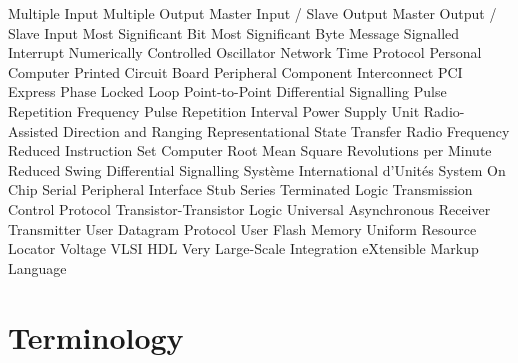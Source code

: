 {\begin{List}
      {Multiple Input Multiple Output}
      {Master Input / Slave Output}
      {Master Output / Slave Input}
       {Most Significant Bit}
       {Most Significant Byte}
       {Message Signalled Interrupt}
       {Numerically Controlled Oscillator}
       {Network Time Protocol}
        {Personal Computer}
       {Printed Circuit Board}
       {Peripheral Component Interconnect}
      {PCI Express}
       {Phase Locked Loop}
      {Point-to-Point Differential Signalling}
       {Pulse Repetition Frequency}
       {Pulse Repetition Interval}
       {Power Supply Unit}
     {Radio-Assisted Direction and Ranging}
      {Representational State Transfer}
        {Radio Frequency}
      {Reduced Instruction Set Computer}
       {Root Mean Square}
       {Revolutions per Minute}
      {Reduced Swing Differential Signalling}
        {Syst\`eme International d'Unit\'es}
       {System On Chip}
       {Serial Peripheral Interface}
      {Stub Series Terminated Logic}
       {Transmission Control Protocol}
       {Transistor-Transistor Logic}
      {Universal Asynchronous Receiver Transmitter}
       {User Datagram Protocol}
       {User Flash Memory}
       {Uniform Resource Locator}
         {Voltage}
      {VLSI HDL}
      {Very Large-Scale Integration}
       {eXtensible Markup Language}
\end{List}

\clearpage
\section{Terminology}

}
